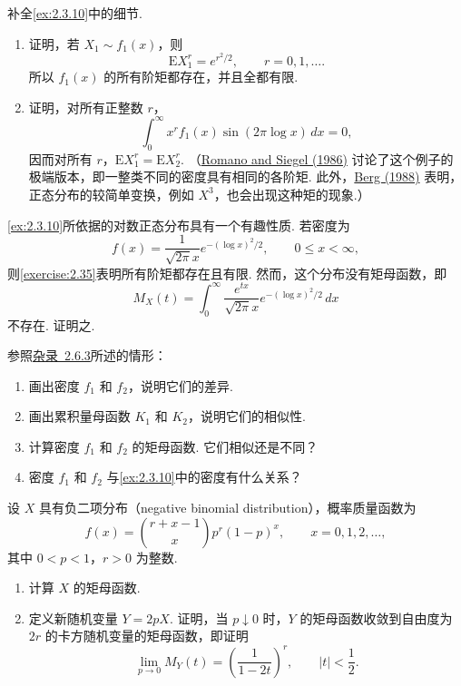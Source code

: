 \begin{exercise}\label{exercise:2.35}
补全\autoref{ex:2.3.10}中的细节.
\begin{enumerate}
\item[(a)] 证明，若 $X_1\sim f_1(x)$，则
$$\mathrm EX_1^r=e^{r^2/2},\qquad r=0,1,\ldots.$$
所以 $f_1(x)$ 的所有阶矩都存在，并且全都有限.
\item[(b)] 证明，对所有正整数 $r$，
$$\int_0^\infty x^rf_1(x)\sin(2\pi\log x)\,dx=0,$$
因而对所有 $r$，$\mathrm EX_1^r=\mathrm EX_2^r$. （\hyperref[bib:source258]{Romano and Siegel (1986)} 讨论了这个例子的极端版本，即一整类不同的密度具有相同的各阶矩. 此外，\hyperref[bib:source16]{Berg (1988)} 表明，正态分布的较简单变换，例如 $X^3$，也会出现这种矩的现象.）
\end{enumerate}
\end{exercise}
\begin{exercise}\label{exercise:2.36}
\autoref{ex:2.3.10}所依据的对数正态分布具有一个有趣性质. 若密度为
$$f(x)=\frac1{\sqrt{2\pi}x}e^{-(\log x)^2/2},\qquad0\le x<\infty,$$
则\autoref{exercise:2.35}表明所有阶矩都存在且有限. 然而，这个分布没有矩母函数，即
$$M_X(t)=\int_0^\infty\frac{e^{tx}}{\sqrt{2\pi}x}e^{-(\log x)^2/2}\,dx$$
不存在. 证明之.
\end{exercise}
\begin{exercise}\label{exercise:2.37}
参照\hyperref[sec:2.6.3]{杂录~2.6.3}所述的情形：
\begin{enumerate}
\item[(a)] 画出密度 $f_1$ 和 $f_2$，说明它们的差异.
\item[(b)] 画出累积量母函数 $K_1$ 和 $K_2$，说明它们的相似性.
\item[(c)] 计算密度 $f_1$ 和 $f_2$ 的矩母函数. 它们相似还是不同？
\item[(d)] 密度 $f_1$ 和 $f_2$ 与\autoref{ex:2.3.10}中的密度有什么关系？
\end{enumerate}
\end{exercise}
\begin{exercise}\label{exercise:2.38}
设 $X$ 具有负二项分布（negative binomial distribution），概率质量函数为
$$f(x)=\binom{r+x-1}x p^r(1-p)^x,\qquad x=0,1,2,\ldots,$$
其中 $0<p<1$，$r>0$ 为整数.
\begin{enumerate}
\item[(a)] 计算 $X$ 的矩母函数.
\item[(b)] 定义新随机变量 $Y=2pX$. 证明，当 $p\downarrow0$ 时，$Y$ 的矩母函数收敛到自由度为 $2r$ 的卡方随机变量的矩母函数，即证明
$$\lim_{p\to0}M_Y(t)=\left(\frac1{1-2t}\right)^r,\qquad |t|<\frac12.$$
\end{enumerate}
\end{exercise}
